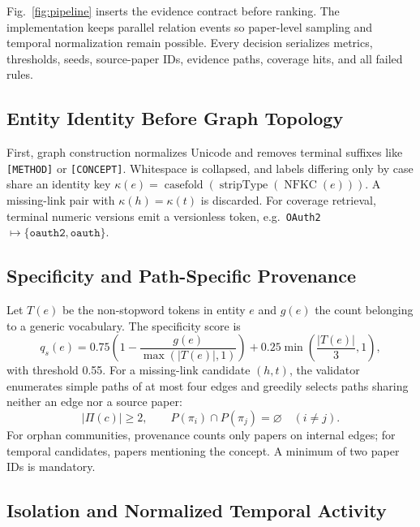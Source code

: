 \documentclass[conference, onecolumn]{IEEEtran}
\begin{document}
Fig.~\ref{fig:pipeline} inserts the evidence contract before ranking. The implementation keeps parallel relation events so paper-level sampling and temporal normalization remain possible. Every decision serializes metrics, thresholds, seeds, source-paper IDs, evidence paths, coverage hits, and all failed rules.

\subsection{Entity Identity Before Graph Topology}

First, graph construction normalizes Unicode and removes terminal suffixes like \texttt{[METHOD]} or \texttt{[CONCEPT]}. Whitespace is collapsed, and labels differing only by case share an identity key $\kappa(e) = \operatorname{casefold}(\allowbreak\operatorname{stripType}(\allowbreak\operatorname{NFKC}(e)))$. A missing-link pair with $\kappa(h)=\kappa(t)$ is discarded. For coverage retrieval, terminal numeric versions emit a versionless token, e.g.\ \texttt{OAuth2}$\mapsto\{\texttt{oauth2},\texttt{oauth}\}$.

\subsection{Specificity and Path-Specific Provenance}

Let $T(e)$ be the non-stopword tokens in entity $e$ and $g(e)$ the count belonging to a generic vocabulary. The specificity score is
\begin{equation}
q_s(e)=0.75\!\left(1-\frac{g(e)}{\max(|T(e)|,1)}\right)+0.25\min\!\left(\frac{|T(e)|}{3},1\right),
\end{equation}
with threshold 0.55. For a missing-link candidate $(h,t)$, the validator enumerates simple paths of at most four edges and greedily selects paths sharing neither an edge nor a source paper:
\begin{equation}
|\Pi(c)|\geq 2,\qquad P(\pi_i)\cap P(\pi_j)=\varnothing\quad(i\neq j).
\end{equation}
For orphan communities, provenance counts only papers on internal edges; for temporal candidates, papers mentioning the concept. A minimum of two paper IDs is mandatory.

\subsection{Isolation and Normalized Temporal Activity}
\end{document}
